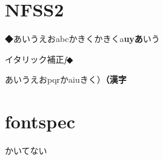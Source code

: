 \documentclass{article}
\begin{document}
\section{NFSS2}

◆あいうえおabcかきく{\gt かきくa{\bf uyあ}いう}

{イタリック補正\textit{f}◆\par}

あいうえおpqr{\dr かaiu}きく）{\bf （漢字}

\section{fontspec}

かいてない
\end{document}
